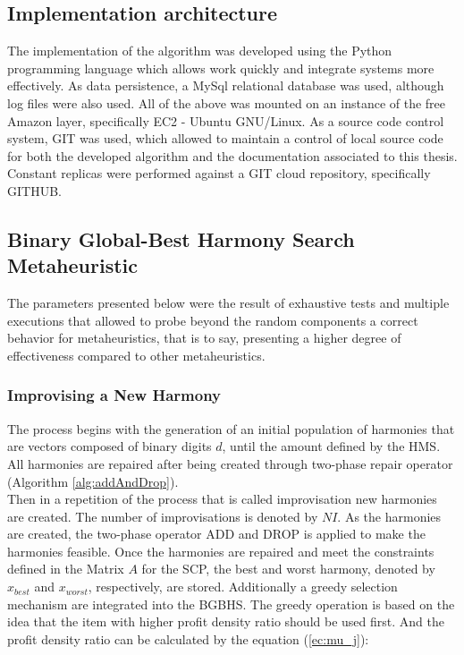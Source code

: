 \subsection{Implementation architecture}
The implementation of the algorithm was developed using the Python programming language which allows work quickly and integrate systems more effectively.
As data persistence, a MySql relational database was used, although log files were also used. All of the above was mounted on an instance of the free Amazon layer, specifically EC2 - Ubuntu GNU/Linux.
As a source code control system, GIT was used, which allowed to maintain a control of local source code for both the developed algorithm and the documentation associated to this thesis. Constant replicas were performed against a GIT cloud repository, specifically GITHUB.
 
\subsection{Binary Global-Best Harmony Search Metaheuristic}
The parameters presented below were the result of exhaustive tests and multiple executions that allowed to probe beyond the random components a correct behavior for metaheuristics, that is to say, presenting a higher degree of effectiveness compared to other metaheuristics.

\subsubsection{Improvising a New Harmony}
The process begins with the generation of an initial population of harmonies that are vectors composed of binary digits $d$, until the amount defined by the HMS. All harmonies are repaired after being created through two-phase repair operator (Algorithm \ref{alg:addAndDrop}).\\

Then in a repetition of the process that is called improvisation new harmonies are created. The number of improvisations is denoted by $NI$. As the harmonies are created, the two-phase operator ADD and DROP is applied to make the harmonies feasible. Once the harmonies are repaired and meet the constraints defined in the  Matrix $A$ for the SCP, the best and worst harmony, denoted by $x_ {best}$ and $x_ {worst}$, respectively, are stored. Additionally a greedy selection mechanism are integrated into the BGBHS. The greedy operation is based on the idea that the item with higher profit density ratio should be used first. And the profit density ratio can be calculated by the equation (\ref{ec:mu_j}): 

